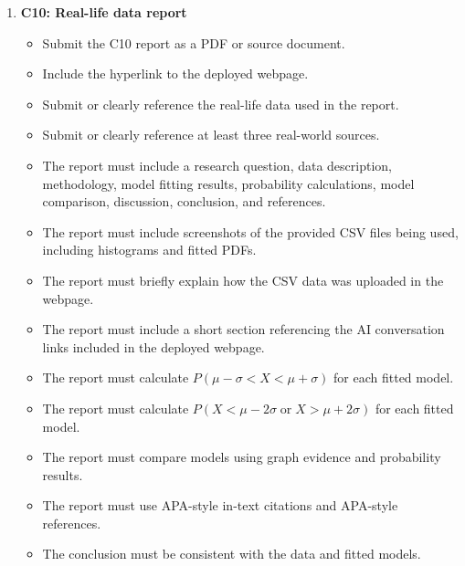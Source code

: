 \documentclass[12pt]{article}
\begin{document}
\begin{enumerate}
		\item \textbf{C10: Real-life data report}
		\begin{itemize}
			\item Submit the C10 report as a PDF or source document.
			\item Include the hyperlink to the deployed webpage.
			\item Submit or clearly reference the real-life data used in the report.
			\item Submit or clearly reference at least three real-world sources.
			\item The report must include a research question, data description, methodology, model fitting results, probability calculations, model comparison, discussion, conclusion, and references.
			\item The report must include screenshots of the provided CSV files being used, including histograms and fitted PDFs.
			\item The report must briefly explain how the CSV data was uploaded in the webpage.
			\item The report must include a short section referencing the AI conversation links included in the deployed webpage.
			\item The report must calculate \(P(\mu-\sigma<X<\mu+\sigma)\) for each fitted model.
			\item The report must calculate \(P(X<\mu-2\sigma\;\text{or}\;X>\mu+2\sigma)\) for each fitted model.
			\item The report must compare models using graph evidence and probability results.
			\item The report must use APA-style in-text citations and APA-style references.
			\item The conclusion must be consistent with the data and fitted models.
		\end{itemize}
	\end{enumerate}
	
\end{document}
